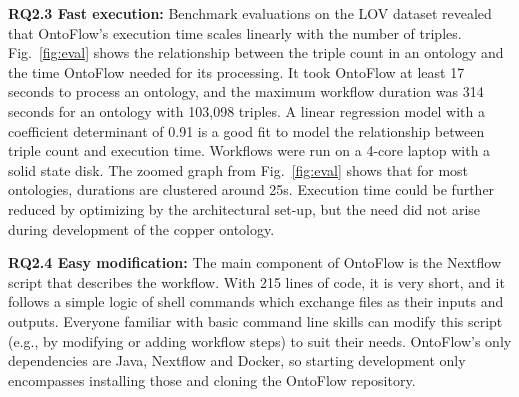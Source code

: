 \documentclass[runningheads]{llncs}
\begin{document}
\noindent\textbf{RQ2.3 Fast execution:} Benchmark evaluations on the LOV dataset revealed that OntoFlow's execution time scales linearly with the number of triples. Fig.~\ref{fig:eval} shows the relationship between the triple count in an ontology and the time OntoFlow needed for its processing. It took OntoFlow at least 17 seconds to process an ontology, and the maximum workflow duration was 314 seconds for an ontology with 103,098 triples. A linear regression model with a coefficient determinant of 0.91 is a good fit to model the relationship between triple count and execution time. Workflows were run on a 4-core laptop with a solid state disk. The zoomed graph from Fig.~\ref{fig:eval} shows that for most ontologies, durations are clustered around 25s. Execution time could be further reduced by optimizing by the architectural set-up, but the need did not arise during development of the copper ontology.

\noindent\textbf{RQ2.4 Easy modification:} The main component of OntoFlow is the Nextflow script that describes the workflow. With 215 lines of code, it is very short, and it follows a simple logic of shell commands which exchange files as their inputs and outputs. Everyone familiar with basic command line skills can modify this script (e.g., by modifying or adding workflow steps) to suit their needs. OntoFlow's only dependencies are Java, Nextflow and Docker, so starting development only encompasses installing those and cloning the OntoFlow repository.
\end{document}
